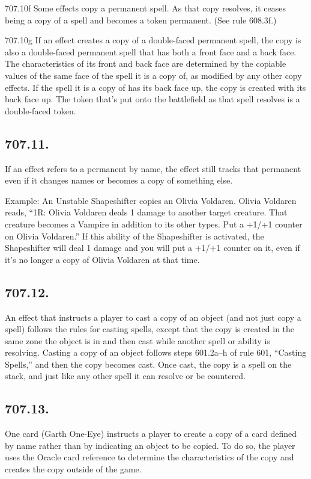 707.10f Some effects copy a permanent spell. As that copy resolves, it ceases being a copy of a spell and becomes a token permanent. (See rule 608.3f.)

707.10g If an effect creates a copy of a double-faced permanent spell, the copy is also a double-faced permanent spell that has both a front face and a back face. The characteristics of its front and back face are determined by the copiable values of the same face of the spell it is a copy of, as modified by any other copy effects. If the spell it is a copy of has its back face up, the copy is created with its back face up. The token that’s put onto the battlefield as that spell resolves is a double-faced token.

\subsection*{707.11.}
If an effect refers to a permanent by name, the effect still tracks that permanent even if it changes names or becomes a copy of something else.

Example: An Unstable Shapeshifter copies an Olivia Voldaren. Olivia Voldaren reads, “{1}{R}: Olivia Voldaren deals 1 damage to another target creature. That creature becomes a Vampire in addition to its other types. Put a +1/+1 counter on Olivia Voldaren.” If this ability of the Shapeshifter is activated, the Shapeshifter will deal 1 damage and you will put a +1/+1 counter on it, even if it’s no longer a copy of Olivia Voldaren at that time.

\subsection*{707.12.}
An effect that instructs a player to cast a copy of an object (and not just copy a spell) follows the rules for casting spells, except that the copy is created in the same zone the object is in and then cast while another spell or ability is resolving. Casting a copy of an object follows steps 601.2a–h of rule 601, “Casting Spells,” and then the copy becomes cast. Once cast, the copy is a spell on the stack, and just like any other spell it can resolve or be countered.

\subsection*{707.13.}
One card (Garth One-Eye) instructs a player to create a copy of a card defined by name rather than by indicating an object to be copied. To do so, the player uses the Oracle card reference to determine the characteristics of the copy and creates the copy outside of the game.

